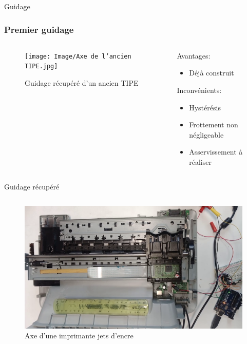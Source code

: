 \documentclass{beamer}
\begin{document}
	
	\begin{frame}{Guidage}
		\frametitle{Premier guidage}
 
		\begin{columns}
			\begin{column}{0.5\textwidth}
				\begin{figure}
					\texttt{[image: Image/Axe de l'ancien TIPE.jpg]}
					\caption{Guidage récupéré d'un ancien TIPE}
				\end{figure}
			\end{column}
			\begin{column}{0.5\textwidth}
				Avantages:
				\begin{itemize}
					\item Déjà construit
				\end{itemize}
				\vspace{12pt}
				Inconvénients:
				
				\begin{itemize}
					\item Hystérésis
					\item Frottement non négligeable
					\item Asservissement à réaliser
				\end{itemize}
			\end{column}
		\end{columns}
	\end{frame}
	\begin{frame}{Guidage récupéré}
		\begin{columns}[T]
			\begin{column}{0.8\textwidth}
				\begin{figure}
					\includegraphics[width=\textwidth]{Image/Imprimante.png}
					\caption{Axe d'une imprimante jets d'encre}
				\end{figure}
			\end{column}
		\end{columns}
	\end{frame}
\end{document}
